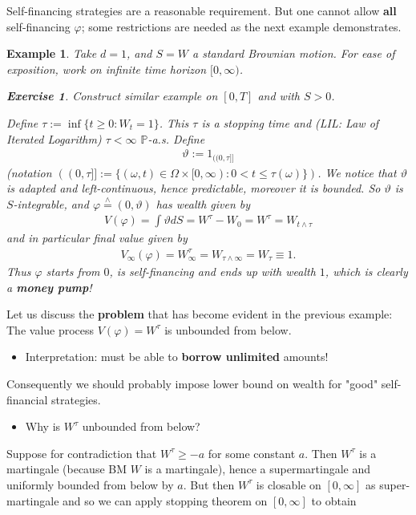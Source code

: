\documentclass[12pt,a4paper, twoside]{article}
\newtheorem{exe}{Exercise}[section]
\newtheorem{exmp}{Example}[section]
\theoremstyle{definition}
\newcommand{\PP}{\mathbb{P}} %
\newcommand{\teq}{\overset{\wedge}{=}}
\begin{document}
Self-financing strategies are a reasonable requirement. But one cannot allow \textbf{all} self-financing $\varphi$; some restrictions are needed as the next example demonstrates. 
\begin{exmp} Take $d=1$, and $S=W$ a standard Brownian motion. For ease of exposition, work on infinite time horizon $[0, \infty)$.
\begin{exe} Construct similar example on $[0,T]$ and with $S>0$. 
\end{exe}
Define $\tau:= \inf \{ t \geq 0 : W_t=1 \}$. This $\tau$ is a stopping time and (LIL: Law of Iterated Logarithm) $\tau < \infty$ $\PP$-a.s. Define 
\begin{align*}
\vartheta:= 1_{(\!(0, \tau]\!]}
\end{align*}
(notation $(\!(0, \tau ]\!] := \{ ( \omega, t) \in \Omega \times [0, \infty) : 0 < t \leq \tau (\omega) \})$. We notice that $\vartheta$ is adapted and left-continuous, hence predictable, moreover it is bounded. So $\vartheta$ is $S$-integrable, and $\varphi \teq (0, \vartheta)$ has wealth given by 
\begin{align*}
V(\varphi)= \int \vartheta dS = W^\tau - W_0 = W^\tau=W_{t \wedge \tau}
\end{align*}
and in particular final value given by 
\begin{align*}
V_\infty( \varphi)= W_\infty^\tau = W_{\tau \wedge \infty} = W_\tau \equiv 1.
\end{align*}
Thus $\varphi$ starts from $0$, is self-financing and ends up with wealth $1$, which is clearly a \textbf{money pump}!
\end{exmp}
\newpage
Let us discuss the \textbf{problem} that has become evident in the previous example: The value process $V( \varphi) = W^\tau$ is unbounded from below.
\begin{itemize}
\item Interpretation: must be able to \textbf{borrow unlimited} amounts!
\end{itemize}
Consequently we should probably impose lower bound on wealth for "good" self-financial strategies. 
\begin{itemize}
\item Why is $W^\tau$ unbounded from below?
\end{itemize}
Suppose for contradiction that $W^\tau \geq -a$ for some constant $a$. Then $W^\tau$ is a martingale (because BM $W$ is a martingale), hence a supermartingale and uniformly bounded from below by $a$. But then $W^\tau$ is closable on $[0, \infty]$ as super-martingale and so we can apply stopping theorem on $[0, \infty]$ to obtain 
\end{document}
